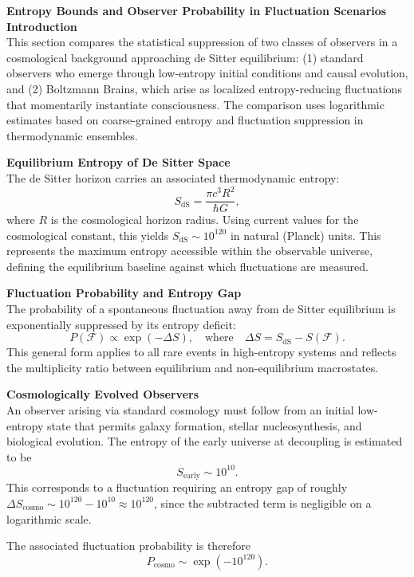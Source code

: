 \begin{technical}
{\Large\textbf{Entropy Bounds and Observer Probability in Fluctuation Scenarios}}\\[0.7em]

\noindent\textbf{Introduction}\\[0.5em]
This section compares the statistical suppression of two classes of observers in a cosmological background approaching de Sitter equilibrium: (1) standard observers who emerge through low-entropy initial conditions and causal evolution, and (2) Boltzmann Brains, which arise as localized entropy-reducing fluctuations that momentarily instantiate consciousness. The comparison uses logarithmic estimates based on coarse-grained entropy and fluctuation suppression in thermodynamic ensembles.

\noindent\textbf{Equilibrium Entropy of De Sitter Space}\\[0.5em]
The de Sitter horizon carries an associated thermodynamic entropy:
\[
S_\text{dS} = \frac{\pi c^3 R^2}{\hbar G},
\]
where \( R \) is the cosmological horizon radius. Using current values for the cosmological constant, this yields \( S_\text{dS} \sim 10^{120} \) in natural (Planck) units. This represents the maximum entropy accessible within the observable universe, defining the equilibrium baseline against which fluctuations are measured.

\noindent\textbf{Fluctuation Probability and Entropy Gap}\\[0.5em]
The probability of a spontaneous fluctuation away from de Sitter equilibrium is exponentially suppressed by its entropy deficit:
\[
P(\mathcal{F}) \propto \exp(-\Delta S), \quad \text{where} \quad \Delta S = S_\text{dS} - S(\mathcal{F}).
\]
This general form applies to all rare events in high-entropy systems and reflects the multiplicity ratio between equilibrium and non-equilibrium macrostates.

\noindent\textbf{Cosmologically Evolved Observers}\\[0.5em]
An observer arising via standard cosmology must follow from an initial low-entropy state that permits galaxy formation, stellar nucleosynthesis, and biological evolution. The entropy of the early universe at decoupling is estimated to be
\[
S_\text{early} \sim 10^{10}.
\]
This corresponds to a fluctuation requiring an entropy gap of roughly \( \Delta S_\text{cosmo} \sim 10^{120} - 10^{10} \approx 10^{120} \), since the subtracted term is negligible on a logarithmic scale.

The associated fluctuation probability is therefore
\[
P_\text{cosmo} \sim \exp(-10^{120}).
\]


\end{technical}
